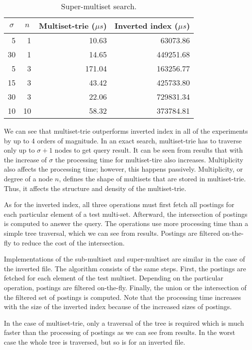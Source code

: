 \begin{table}[h]
\center
\begin{tabular}{|r|r|r|r|}
\hline
\multicolumn{1}{|c|}{$\sigma$} & 
\multicolumn{1}{c|}{$n$} & 
\multicolumn{1}{c|}{Multiset-trie ($\mu s$)} & 
\multicolumn{1}{c|}{Inverted index ($\mu s$)} \\
\hline
5		& 1 		& 10.63 & 63073.86\\
\hline
30	& 1 		& 14.65 & 449251.68\\
\hline
5		& 3 		& 171.04 & 163256.77\\
\hline
15	& 3 		& 43.42 & 425733.80\\
\hline
30	& 3 		& 22.06 & 729831.34\\
\hline
10	& 10 	& 58.32 & 373784.81\\
\hline
\end{tabular}
\caption{Super-multiset search.}
\label{t:res_sup}
\end{table}

We can see that multiset-trie outperforms inverted index in all of the experiments by up to 4 orders of magnitude. In an exact search, multiset-trie has to traverse only up to $\sigma+1$ nodes to get query result. It can be seen from results that with the increase of $\sigma$ the processing time for multiset-tire also increases. Multiplicity also affects the processing time; however, this happens passively. Multiplicity, or degree of a node $n$, defines the shape of multisets that are stored in multiset-trie. Thus, it affects the structure and density of the multiset-trie.

As for the inverted index, all three operations must first fetch all postings for each particular element of a test multi-set. Afterward, the intersection of postings is computed to answer the query. The operations use more processing time than a simple tree traversal, which we can see from results. Postings are filtered on-the-fly to reduce the cost of the intersection. 

Implementations of the sub-multiset and super-multiset are similar in the case of the inverted file. The algorithm consists of the same steps. First, the postings are fetched for each element of the test multiset. Depending on the particular operation, postings are filtered on-the-fly. Finally, the union or the intersection of the filtered set of postings is computed. Note that the processing time increases with the size of the inverted index because of the increased sizes of postings. 

In the case of multiset-trie, only a traversal of the tree is required which is much faster than the processing of postings as we can see from results. In the worst case the whole tree is traversed, but so is for an inverted file.